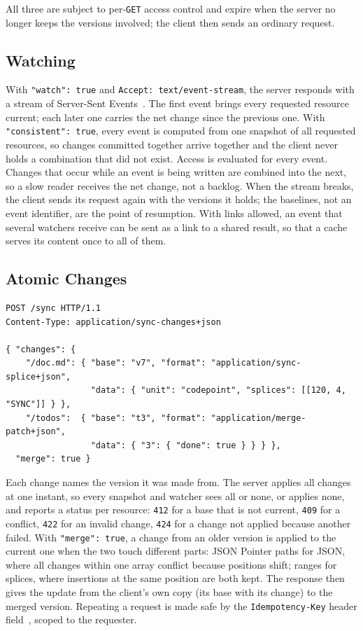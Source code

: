 \documentclass[11pt,a4paper]{article}
\begin{document}
All three are subject to per-\texttt{GET} access control and expire when the server no longer keeps the versions involved; the client then sends an ordinary request.

\subsection{Watching}
\label{sec:watch}

With \texttt{"watch": true} and \texttt{Accept: text/event-stream}, the server responds with a stream of Server-Sent Events~\cite{html}. The first event brings every requested resource current; each later one carries the net change since the previous one. With \texttt{"consistent": true}, every event is computed from one snapshot of all requested resources, so changes committed together arrive together and the client never holds a combination that did not exist. Access is evaluated for every event. Changes that occur while an event is being written are combined into the next, so a slow reader receives the net change, not a backlog. When the stream breaks, the client sends its request again with the versions it holds; the baselines, not an event identifier, are the point of resumption. With links allowed, an event that several watchers receive can be sent as a link to a shared result, so that a cache serves its content once to all of them.

\subsection{Atomic Changes}
\label{sec:writes}

\begin{lstlisting}[style=code]
POST /sync HTTP/1.1
Content-Type: application/sync-changes+json

{ "changes": {
    "/doc.md": { "base": "v7", "format": "application/sync-splice+json",
                 "data": { "unit": "codepoint", "splices": [[120, 4, "SYNC"]] } },
    "/todos":  { "base": "t3", "format": "application/merge-patch+json",
                 "data": { "3": { "done": true } } } },
  "merge": true }
\end{lstlisting}

Each change names the version it was made from. The server applies all changes at one instant, so every snapshot and watcher sees all or none, or applies none, and reports a status per resource: \texttt{412} for a base that is not current, \texttt{409} for a conflict, \texttt{422} for an invalid change, \texttt{424} for a change not applied because another failed. With \texttt{"merge": true}, a change from an older version is applied to the current one when the two touch different parts: JSON Pointer paths for JSON, where all changes within one array conflict because positions shift; ranges for splices, where insertions at the same position are both kept. The response then gives the update from the client's own copy (its base with its change) to the merged version. Repeating a request is made safe by the \texttt{Idempotency-Key} header field~\cite{idempotency}, scoped to the requester.
\end{document}
